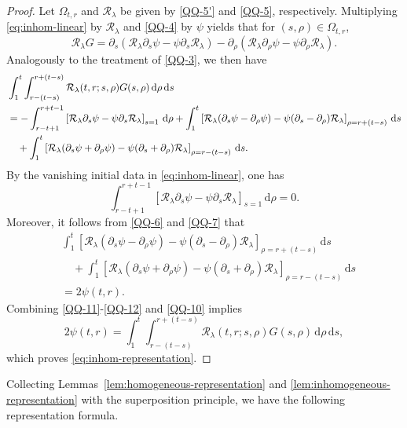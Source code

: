\documentclass[11pt,twoside]{article}
\newcommand{\p}{\partial}
\newcommand{\dd}{\,\mathrm{d}}
\newcommand{\Rcal}{\mathcal R}
\theoremstyle{plain}
\theoremstyle{definition}
\theoremstyle{remark}
\numberwithin{equation}{section}
\begin{document}
\begin{proof}
Let $\Omega_{t,r}$ and $\Rcal_\lambda$ be given by
\eqref{QQ-5'} and \eqref{QQ-5}, respectively. Multiplying
\eqref{eq:inhom-linear} by $\Rcal_\lambda$ and \eqref{QQ-4} by $\psi$
yields that for $(s,\rho)\in\Omega_{t,r}$,
\begin{equation}
\label{QQ-9}
\Rcal_\lambda G
=\p_s\left(
\Rcal_\lambda\p_s\psi-\psi\p_s\Rcal_\lambda
\right)
-\p_\rho\left(
\Rcal_\lambda\p_\rho\psi-\psi\p_\rho\Rcal_\lambda
\right).
\end{equation}
Analogously to the treatment of \eqref{QQ-3},
we then have
\begin{align}
&\int_1^t\int_{r-(t-s)}^{r+(t-s)}
\Rcal_\lambda(t,r;s,\rho)G(s,\rho)\dd\rho\dd s\notag\\
&=-\int_{r-t+1}^{r+t-1}
\left[
\Rcal_\lambda\p_s\psi-\psi\p_s\Rcal_\lambda
\right]_{s=1}\dd\rho\notag+\int_1^t
\left[
\Rcal_\lambda(\p_s\psi-\p_\rho\psi)
-\psi(\p_s-\p_\rho)\Rcal_\lambda
\right]_{\rho=r+(t-s)}\dd s\notag\\
&\quad+\int_1^t
\left[
\Rcal_\lambda(\p_s\psi+\p_\rho\psi)
-\psi(\p_s+\p_\rho)\Rcal_\lambda
\right]_{\rho=r-(t-s)}\dd s.
\label{QQ-10}
\end{align}
By the vanishing initial data  in \eqref{eq:inhom-linear}, one has
\begin{equation}
\label{QQ-11}
\int_{r-t+1}^{r+t-1}
\left[
\Rcal_\lambda\p_s\psi-\psi\p_s\Rcal_\lambda
\right]_{s=1}\dd\rho
=0.
\end{equation}
Moreover, it follows from \eqref{QQ-6} and \eqref{QQ-7} that
\begin{equation}
\label{QQ-12}
\begin{aligned}
&\int_1^t
\left[
\Rcal_\lambda(\p_s\psi-\p_\rho\psi)
-\psi(\p_s-\p_\rho)\Rcal_\lambda
\right]_{\rho=r+(t-s)}\dd s\\
&\quad +\int_1^t
\left[
\Rcal_\lambda(\p_s\psi+\p_\rho\psi)
-\psi(\p_s+\p_\rho)\Rcal_\lambda
\right]_{\rho=r-(t-s)}\dd s\\
&=2\psi(t,r).
\end{aligned}
\end{equation}
Combining \eqref{QQ-11}-\eqref{QQ-12} and \eqref{QQ-10} implies
\begin{equation}
\label{QQ-14}
2\psi(t,r)
=\int_1^t\int_{r-(t-s)}^{r+(t-s)}\Rcal_\lambda(t,r;s,\rho)G(s,\rho)\dd\rho\dd s,
\end{equation}
which proves
\eqref{eq:inhom-representation}.
\end{proof}
Collecting Lemmas~\ref{lem:homogeneous-representation} and
\ref{lem:inhomogeneous-representation} with the superposition principle,
we have the following representation formula.
\end{document}
